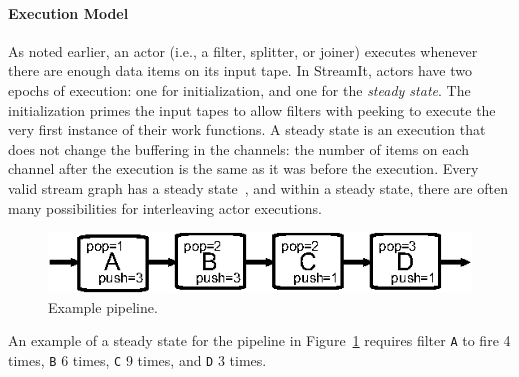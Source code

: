 \paragraph*{Execution Model}
As noted earlier, an actor (i.e., a filter, splitter, or joiner)
executes whenever there are enough data items on its input 
tape. In StreamIt, actors have  two epochs
of execution: one for initialization, and one for the {\it steady
state}. The initialization primes the input tapes to allow filters with
peeking to execute the very first instance of their work functions.
A steady state is an execution that does not change the
buffering in the channels: the number of items on each channel
after the execution is the same as it was before the execution. 
Every valid stream graph has a steady state~\cite{LM87-i}, and within
a steady state, there are often many possibilities for interleaving
actor executions. 
\begin{figure}[t]
\begin{center}
 \includegraphics[scale=1, angle=0]{./pipe-with-rates.eps}
 \caption{Example pipeline.}
 \label{fig:pipe-with-rates}
\end{center}
\end{figure}
An example of a steady state for the pipeline in
Figure~\ref{fig:pipe-with-rates} requires filter \texttt{A} to fire
4 times, \texttt{B} 6 times, \texttt{C} 9 times, and
\texttt{D} 3 times. 

